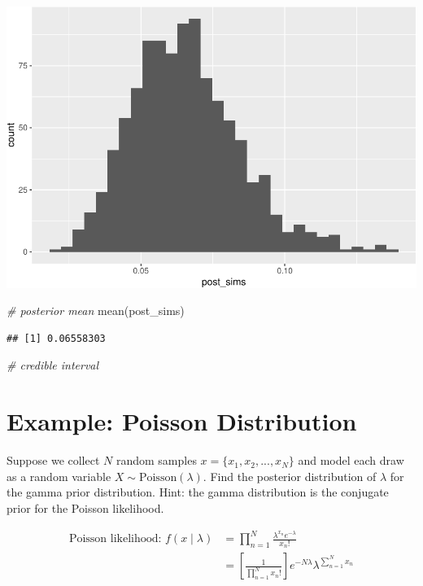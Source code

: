 \documentclass[
]{book}
\newenvironment{Shaded}{\begin{snugshade}}{\end{snugshade}}
\newcommand{\CommentTok}[1]{\textcolor[rgb]{0.56,0.35,0.01}{\textit{#1}}}
\newcommand{\FunctionTok}[1]{\textcolor[rgb]{0.00,0.00,0.00}{#1}}
\newcommand{\NormalTok}[1]{#1}
\begin{document}
\includegraphics{02-01-bayes_files/figure-latex/unnamed-chunk-6-1.pdf}

\begin{Shaded}
\begin{Highlighting}[]
\CommentTok{\# posterior mean}
\FunctionTok{mean}\NormalTok{(post\_sims)}
\end{Highlighting}
\end{Shaded}

\begin{verbatim}
## [1] 0.06558303
\end{verbatim}

\begin{Shaded}
\begin{Highlighting}[]
\CommentTok{\# credible interval}
\end{Highlighting}
\end{Shaded}

\hypertarget{example-poisson-distribution-3}{%
\section{Example: Poisson Distribution}\label{example-poisson-distribution-3}}

Suppose we collect \(N\) random samples \(x = \{x_1, x_2, ..., x_N\}\) and model each draw as a random variable \(X \sim \text{Poisson}(\lambda)\). Find the posterior distribution of \(\lambda\) for the gamma prior distribution. Hint: the gamma distribution is the conjugate prior for the Poisson likelihood.

\[
\begin{aligned}
\text{Poisson likelihood: } f(x \mid \lambda) &= \prod_{n = 1}^N \frac{\lambda^{x_n} e^{-\lambda}}{x_n!} \\
&= \displaystyle \left[ \frac{1}{\prod_{n = 1}^N x_n !} \right]e^{-N\lambda}\lambda^{\sum_{n = 1}^N x_n}
\end{aligned}
\]
\end{document}
